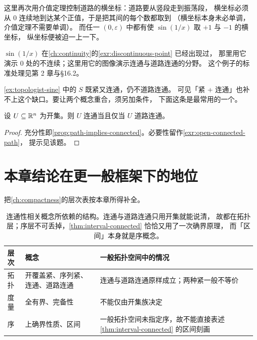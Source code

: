 \begin{remark}
  这里再次用介值定理控制道路的横坐标：道路要从竖段走到振荡段，
  横坐标必须从 \(0\) 连续地到达某个正值，于是把其间的每个数都取到
  （横坐标本身未必单调，介值定理不需要单调）。
  而任一 \((0,\varepsilon)\) 中都有使 \(\sin(1/x)\) 取 \(+1\) 与 \(-1\) 的横坐标，
  纵坐标便被迫一上一下。

  \(\sin(1/x)\) 在\cref{ch:continuity}的\cref{exr:discontinuous-point} 已经出现过，
  那里用它演示 \(0\) 处的不连续；这里用它的图像演示连通与道路连通的分野。
  这个例子的标准处理见\textcite{pugh2015}第 2 章与\textcite{garling2013b}§16.2。
\end{remark}

\begin{remark}
  \cref{ex:topologist-sine} 中的 \(S\) 既紧又连通，仍不道路连通。
  可见「紧 + 连通」也补不上这个缺口。要让两个概念重合，须另加条件，
  下面这条是最常用的一个。
\end{remark}

\begin{theorem}[开连通集即道路连通]
  \label{thm:open-connected-path}
  设 \(U \subseteq \mathbb{R}^{n}\) 为开集。则 \(U\) 连通当且仅当 \(U\) 道路连通。
\end{theorem}

\begin{proof}
  充分性即\cref{prop:path-implies-connected}。必要性留作\cref{exr:open-connected-path}，
  提示见该题。
\end{proof}

\section{本章结论在更一般框架下的地位}
\label{sec:ch5-outlook}

把\cref{ch:compactness}的层次表按本章所得补全。

\begin{table}[htbp]
  \centering
  \caption{连通性相关概念所依赖的结构。连通与道路连通只用开集就能说清，
    故都在拓扑层；序层不可丢掉，\cref{thm:interval-connected} 恰恰又用了一次确界原理，
    而「区间」本身就是序概念。}
  \label{tab:ch5-structure}
  \begin{tabular}{@{}llp{5.4cm}@{}}
    \toprule
    层次 & 概念 & 一般拓扑空间中的情况 \\
    \midrule
    拓扑 & 开覆盖紧、序列紧、连通、道路连通
         & 连通与道路连通原样成立；两种紧一般不等价 \\
    度量 & 全有界、完备性 & 不能仅由开集族决定 \\
    序   & 上确界性质、区间
         & 一般拓扑空间未指定序，故不能直接表述\cref{thm:interval-connected} 的区间刻画 \\
    \bottomrule
  \end{tabular}
\end{table}

